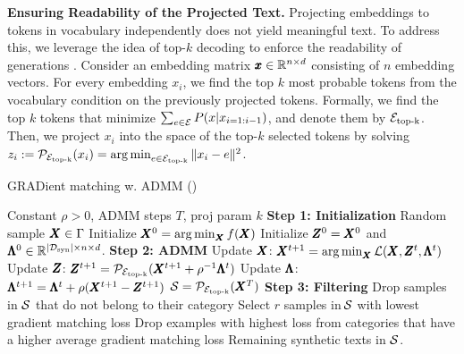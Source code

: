 \textbf{Ensuring Readability of the Projected Text.}
Projecting embeddings to tokens in vocabulary independently does not yield meaningful text. To address this, we leverage the idea of top-$k$ decoding to enforce the readability of generations \cite{fan2018hierarchical}. 
%
Consider an embedding matrix $\pmb{x} \in {\mathbb{R}}^{n \times d}$ consisting of $n$ embedding vectors.
For every embedding $x_i$, we find the top $k$ most probable tokens from the vocabulary %
%
condition on the previously projected tokens.
Formally, we find the top $k$ tokens that minimize $\sum_{e\in {\mathcal{E}}} P(x|x_{i=1:i-1})$, and denote them by ${\mathcal{E}}_{\text{top-k}}$. Then, we project $x_i$ into the space of the top-$k$ selected tokens by solving $z_i := {\mathcal{P}}_{{\mathcal{E}}_{\text{top-k}}}(x_i)= \operatorname*{arg\,min}_{e \in {\mathcal{E}}_{\text{top-k}}} \|x_i - e\|^2$. 
%
\begin{algorithm}[!t]
    \caption{GRADient matching w. ADMM (\alg)}
    \label{alg:admm-q}
    \begin{algorithmic}[1]
         Constant $\rho > 0$, 
        ADMM steps $T$, proj param $k$
        \STATE \textbf{Step 1: Initialization}
        \STATE Random sample $\pmb{X} \in \Gamma$
        \STATE Initialize $\pmb{X}^0 = \operatorname*{arg\,min}_{\pmb{X}} f(\pmb{X})$
        \STATE Initialize $\pmb{Z}^0 = \pmb{X}^0$
         and $\pmb{\Lambda}^0 \in {\mathbb{R}}^{|{\mathcal{D}}_\text{syn}| \times n \times d}$.
        \STATE \textbf{Step 2: ADMM}
        \STATE Update $\pmb{X}$: %
        $\pmb{X}^{t+1} = \operatorname*{arg\,min}_{\pmb{X}} {\mathcal{L}}(\pmb{X}, \pmb{Z}^{t}, \pmb{\Lambda}^t)$ 
        \STATE Update $\pmb{Z}$: $\pmb{Z}^{t+1} = {\mathcal{P}}_{{\mathcal{E}}_{\text{top-k}}}(\pmb{X}^{t+1} + \rho^{-1} \pmb{\Lambda}^t)$ 
        \STATE Update $\pmb{\Lambda}$: $\pmb{\Lambda}^{t+1} = \pmb{\Lambda}^{t} + \rho (\pmb{X}^{t+1} - \pmb{Z}^{t+1})$ 
        \ENDFOR
        \STATE ${\mathcal{S}} = {\mathcal{P}}_{{\mathcal{E}}_{\text{top-k}}}(\pmb{X}^T)$
        \STATE \textbf{Step 3: Filtering}
        \STATE Drop samples in ${\mathcal{S}}$ that do not belong to their category 
        \STATE Select $r\!$ samples in $\!{\mathcal{S}}$ %
        with lowest gradient matching loss
        \STATE Drop examples with highest loss from categories that have a higher average gradient matching loss
         Remaining synthetic texts in ${\mathcal{S}}$. %
    \end{algorithmic}
\end{algorithm}
%
%



